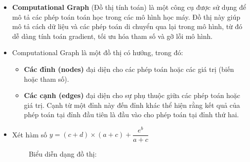 \documentclass[final,letterpaper,twoside,12pt]{report}
\begin{document}
\begin{itemize}
	\item \textbf{Computational Graph} (Đồ thị tính toán) là một công cụ được sử dụng để mô tả các phép toán toán học trong các mô hình học máy. Đồ thị này giúp mô tả cách dữ liệu và các phép toán di chuyển qua lại trong mô hình, từ đó dễ dàng tính toán gradient, tối ưu hóa tham số và gỡ lỗi mô hình.

	\item Computational Graph là một đồ thị có hướng, trong đó:

	      \begin{itemize}
		      \item \textbf{Các đỉnh (nodes)} đại diện cho các phép toán hoặc các giá trị (biến hoặc tham số).

		      \item \textbf{Các cạnh (edges)} đại diện cho sự phụ thuộc giữa các phép toán hoặc giá trị. Cạnh từ một đỉnh này đến đỉnh khác thể hiện rằng kết quả của phép toán tại đỉnh đầu tiên là đầu vào cho phép toán tại đỉnh thứ hai.
	      \end{itemize}

	      \newpage

	\item Xét hàm số  $y = (c+d)\times (a+c) + \dfrac{e^b}{a+c} $

	      $\hspace{1cm}$Biểu diễn dạng đồ thị:

\end{itemize}
\end{document}
